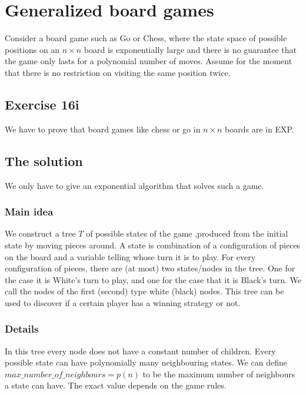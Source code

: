 \section*{Generalized board games}

Consider a board game such as Go or Chess, where the state space of possible
positions on an $n \times n$ board is exponentially large and there is no guarantee that the game
only lasts for a polynomial number of moves. Assume for the moment that there is no
restriction on visiting the same position twice.


\subsection*{Exercise 16i}

We have to prove that board games like chess or go in $n \times n$ boards are in EXP.

\subsection*{The solution}

We only have to give an exponential algorithm that solves such a 
game. 

\subsubsection*{Main idea}
We construct a tree $T$ of possible states of the game ,produced from the initial state by 
moving pieces around. A state is combination of a configuration of pieces on the board
 and a variable telling whose turn it is to play. For every configuration of pieces, there are
 (at most) two states/nodes in the tree. One for the case it is White's turn to play, and one 
for the case that it is Black's turn. We call the nodes of the first (second) type white (black) nodes.
This tree can be used to discover if a certain player 
has a winning strategy or not. 

\subsubsection*{Details}

In this tree every node does not have a constant number of children. Every possible state can have polynomially many 
neighbouring states. We can define $max\_number\_of\_neighbours = p(n)$ to be the maximum number of neighbours a state can 
have. The exact value depends on the game rules. 

